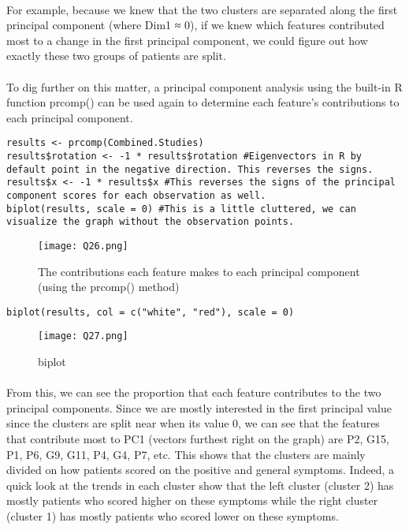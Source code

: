 \documentclass{article}
\begin{document}
\paragraph{} For example, because we knew that the two clusters are separated along the first principal component (where Dim1 ≈ 0), if we knew which features contributed most to a change in the first principal component, we could figure out how exactly these two groups of patients are split.
\paragraph{}To dig further on this matter, a principal component analysis using the built-in R function prcomp() can be used again to determine each feature's contributions to each principal component.

\begin{lstlisting}
results <- prcomp(Combined.Studies)
results$rotation <- -1 * results$rotation #Eigenvectors in R by default point in the negative direction. This reverses the signs.
results$x <- -1 * results$x #This reverses the signs of the principal component scores for each observation as well.
biplot(results, scale = 0) #This is a little cluttered, we can visualize the graph without the observation points.
\end{lstlisting}	
	\begin{figure}[H]
		\centering
		\texttt{[image: Q26.png]}
		\caption{ The contributions each feature makes to each principal component (using the prcomp() method)}
	\end{figure}

\begin{lstlisting}
biplot(results, col = c("white", "red"), scale = 0)
\end{lstlisting}

	\begin{figure}[H]
		\centering
		\texttt{[image: Q27.png]}
		\caption{biplot}
	\end{figure}
\paragraph{} From this, we can see the proportion that each feature contributes to the two principal components. Since we are mostly interested in the first principal value since the clusters are split near when its value 0, we can see that the features that contribute most to PC1 (vectors furthest right on the graph) are P2, G15, P1, P6, G9, G11, P4, G4, P7, etc. This shows that the clusters are mainly divided on how patients scored on the positive and general symptoms. Indeed, a quick look at the trends in each cluster show that the left cluster (cluster 2) has mostly patients who scored higher on these symptoms while the right cluster (cluster 1) has mostly patients who scored lower on these symptoms.
\end{document}
